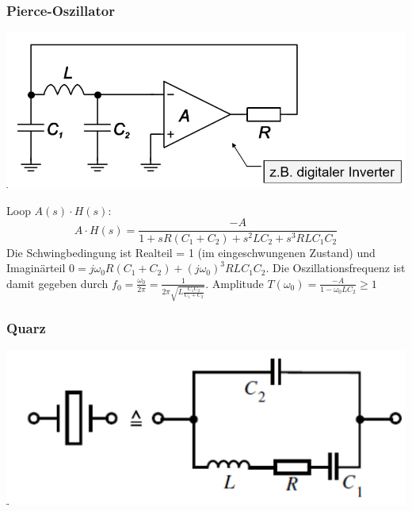 \subsubsection{Pierce-Oszillator}
\begin{center}
	\includegraphics[width=0.6\columnwidth]{Images/piece}
\end{center}
Loop $A(s) \cdot H(s)$:
\[
A \cdot H(s) = \frac{-A}{1 + sR(C_1 + C_2) + s^2LC_2 + s^3RLC_1C_2}
\]
Die Schwingbedingung ist Realteil = 1 (im eingeschwungenen Zustand) und Imaginärteil $0 = j\omega_0R(C_1 + C_2) + (j\omega_0)^3RLC_1C_2$. Die Oszillationsfrequenz ist damit gegeben durch $f_0 = \frac{\omega_0}{2\pi} = \frac{1}{2\pi\sqrt{L\frac{C_1C_2}{C_1 +C_2}}}$. Amplitude $T(\omega_0) = \frac{-A}{1 - \omega_0LC_2} \geq 1$

\subsubsection{Quarz}
\begin{center}
	\includegraphics[width=0.6\columnwidth]{Images/quarz}
\end{center}
